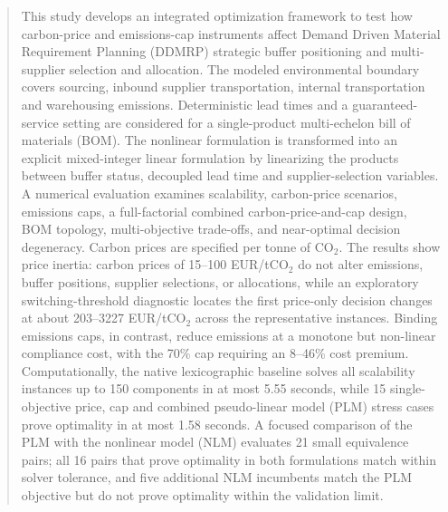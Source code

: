 \documentclass[preprint,12pt,authoryear]{elsarticle}
\begin{document}
\begin{frontmatter}
\begin{abstract}
 This study develops an integrated optimization framework to test how carbon-price and emissions-cap instruments affect Demand Driven Material Requirement Planning (DDMRP) strategic buffer positioning and multi-supplier selection and allocation. The modeled environmental boundary covers sourcing, inbound supplier transportation, internal transportation and warehousing emissions. Deterministic lead times and a guaranteed-service setting are considered for a single-product multi-echelon bill of materials (BOM).
 The nonlinear formulation is transformed into an explicit mixed-integer linear formulation by linearizing the products between buffer status, decoupled lead time and supplier-selection variables. A numerical evaluation examines scalability, carbon-price scenarios, emissions caps, a full-factorial combined carbon-price-and-cap design, BOM topology, multi-objective trade-offs, and near-optimal decision degeneracy. Carbon prices are specified per tonne of CO$_2$. The results show price inertia: carbon prices of 15--100 EUR/tCO$_2$ do not alter emissions, buffer positions, supplier selections, or allocations, while an exploratory switching-threshold diagnostic locates the first price-only decision changes at about 203--3227 EUR/tCO$_2$ across the representative instances. Binding emissions caps, in contrast, reduce emissions at a monotone but non-linear compliance cost, with the 70\% cap requiring an 8--46\% cost premium.
 Computationally, the native lexicographic baseline solves all scalability instances up to 150 components in at most 5.55 seconds, while 15 single-objective price, cap and combined pseudo-linear model (PLM) stress cases prove optimality in at most 1.58 seconds. A focused comparison of the PLM with the nonlinear model (NLM) evaluates 21 small equivalence pairs; all 16 pairs that prove optimality in both formulations match within solver tolerance, and five additional NLM incumbents match the PLM objective but do not prove optimality within the validation limit.

\end{abstract}




\end{frontmatter}
\end{document}
